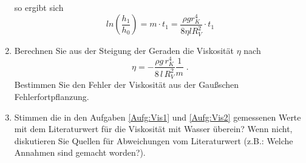 \begin{enumerate}
\begin{hint}
	so ergibt sich
	\begin{equation}
		ln\left(\frac{h_1}{h_0}\right) = m\cdot t_1 = \frac{\rho g r_K^4}{8\eta l R_V^2}\cdot t_1
	\end{equation}
	\end{hint}
 \item \label{Aufg:Vis2}
 Berechnen Sie aus der Steigung der Geraden die Viskosität $\eta$ nach
  \begin{equation}
   \eta = -\frac{\rho g\,r_K^4}{8\,l\,R^2_V}\frac{1}{m}\; .
  \end{equation}
 Bestimmen Sie den Fehler der Viskosität aus der Gaußschen Fehlerfortpflanzung.
 \item Stimmen die in den Aufgaben \ref{Aufg:Vis1} und \ref{Aufg:Vis2} gemessenen Werte mit dem Literaturwert für die Viskosität mit Wasser überein? Wenn nicht, diskutieren Sie Quellen für Abweichungen vom Literaturwert (z.B.: Welche Annahmen sind gemacht worden?).
\end{enumerate}